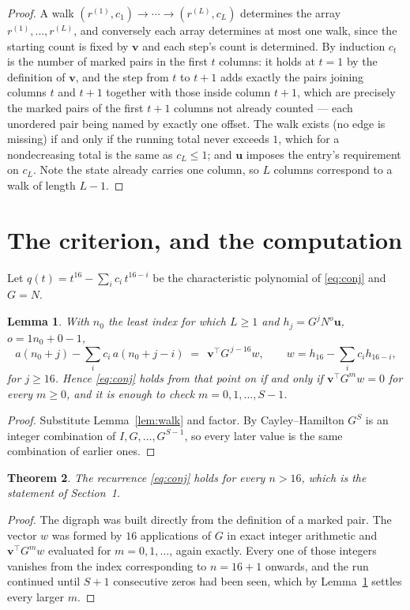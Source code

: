 \documentclass[11pt,a4paper]{article}
\theoremstyle{plain}
\newtheorem{theorem}{Theorem}
\newtheorem{lemma}[theorem]{Lemma}
\theoremstyle{definition}
\begin{document}
\begin{proof}
A walk $(r^{(1)},c_1)\to\cdots\to(r^{(L)},c_L)$ determines the array
$r^{(1)},\dots,r^{(L)}$, and conversely each array determines at most one walk, since the
starting count is fixed by $\mathbf{v}$ and each step's count is determined. By induction
$c_t$ is the number of marked pairs in the first $t$ columns: it holds at $t=1$ by the
definition of $\mathbf{v}$, and the step from $t$ to $t+1$ adds exactly the pairs joining
columns $t$ and $t+1$ together with those inside column $t+1$, which are precisely the marked
pairs of the first $t+1$ columns not already counted --- each unordered pair being named by
exactly one offset. The walk exists (no edge is missing) if and only if the running total
never exceeds $1$, which for a nondecreasing total is the same as $c_L\le1$; and
$\mathbf{u}$ imposes the entry's requirement on $c_L$. Note the state already carries one
column, so $L$ columns correspond to a walk of length $L-1$.
\end{proof}

\section{The criterion, and the computation}

Let $q(t)=t^{16}-\sum_i c_i\,t^{16-i}$ be the characteristic polynomial of
\eqref{eq:conj} and $G=N$.

\begin{lemma}\label{lem:crit}
With $n_0$ the least index for which $L\ge1$ and $h_j=G^{j}N^{o}\mathbf{u}$,
$o=1n_0+0-1$,
\[
a(n_0+j)-\sum_i c_i\,a(n_0+j-i)\;=\;\,\mathbf{v}^{\!\top}G^{\,j-16}w,
\qquad w=h_{16}-\sum_i c_i h_{16-i},
\]
for $j\ge16$. Hence \eqref{eq:conj} holds from that point on if and only if
$\mathbf{v}^{\!\top}G^{m}w=0$ for every $m\ge0$, and it is enough to check
$m=0,1,\dots,S-1$.
\end{lemma}

\begin{proof}
Substitute Lemma~\ref{lem:walk} and factor. By Cayley--Hamilton $G^{S}$ is an integer
combination of $I,G,\dots,G^{S-1}$, so every later value is the same combination of earlier
ones.
\end{proof}

\begin{theorem}
The recurrence \eqref{eq:conj} holds for every $n>16$, which is the statement of
Section~1.
\end{theorem}

\begin{proof}
The digraph was built directly from the definition of a marked pair. The vector $w$ was
formed by $16$ applications of $G$ in exact integer arithmetic and
$\mathbf{v}^{\!\top}G^{m}w$ evaluated for $m=0,1,\dots$, again exactly. Every one of
those integers vanishes from the index corresponding to $n=16+1$ onwards, and the run
continued until $S+1$ consecutive zeros had been seen, which by Lemma~\ref{lem:crit}
settles every larger $m$.
\end{proof}
\end{document}
